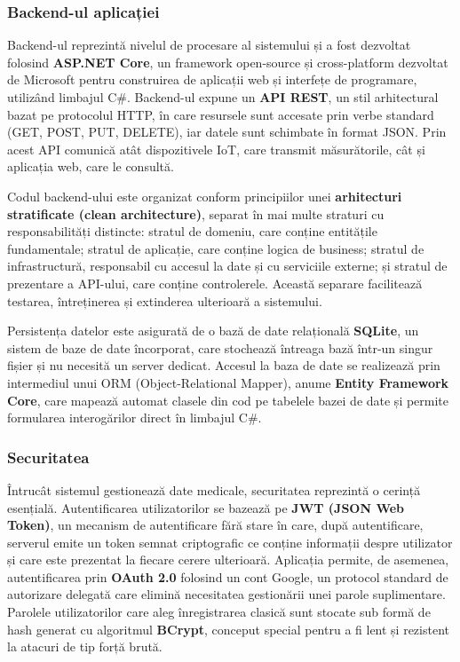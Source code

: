 \documentclass[12pt,a4paper]{article}
\begin{document}
\subsubsection{Backend-ul aplicației}

Backend-ul reprezintă nivelul de procesare al sistemului și a fost dezvoltat folosind \textbf{ASP.NET Core}, un framework open-source și cross-platform dezvoltat de Microsoft pentru construirea de aplicații web și interfețe de programare, utilizând limbajul C\#. Backend-ul expune un \textbf{API REST}, un stil arhitectural bazat pe protocolul HTTP, în care resursele sunt accesate prin verbe standard (GET, POST, PUT, DELETE), iar datele sunt schimbate în format JSON. Prin acest API comunică atât dispozitivele IoT, care transmit măsurătorile, cât și aplicația web, care le consultă.

Codul backend-ului este organizat conform principiilor unei \textbf{arhitecturi stratificate (clean architecture)}, separat în mai multe straturi cu responsabilități distincte: stratul de domeniu, care conține entitățile fundamentale; stratul de aplicație, care conține logica de business; stratul de infrastructură, responsabil cu accesul la date și cu serviciile externe; și stratul de prezentare a API-ului, care conține controlerele. Această separare facilitează testarea, întreținerea și extinderea ulterioară a sistemului.

Persistența datelor este asigurată de o bază de date relațională \textbf{SQLite}, un sistem de baze de date încorporat, care stochează întreaga bază într-un singur fișier și nu necesită un server dedicat. Accesul la baza de date se realizează prin intermediul unui ORM (Object-Relational Mapper), anume \textbf{Entity Framework Core}, care mapează automat clasele din cod pe tabelele bazei de date și permite formularea interogărilor direct în limbajul C\#.

\subsubsection{Securitatea}

Întrucât sistemul gestionează date medicale, securitatea reprezintă o cerință esențială. Autentificarea utilizatorilor se bazează pe \textbf{JWT (JSON Web Token)}, un mecanism de autentificare fără stare în care, după autentificare, serverul emite un token semnat criptografic ce conține informații despre utilizator și care este prezentat la fiecare cerere ulterioară. Aplicația permite, de asemenea, autentificarea prin \textbf{OAuth 2.0} folosind un cont Google, un protocol standard de autorizare delegată care elimină necesitatea gestionării unei parole suplimentare. Parolele utilizatorilor care aleg înregistrarea clasică sunt stocate sub formă de hash generat cu algoritmul \textbf{BCrypt}, conceput special pentru a fi lent și rezistent la atacuri de tip forță brută.
\end{document}
